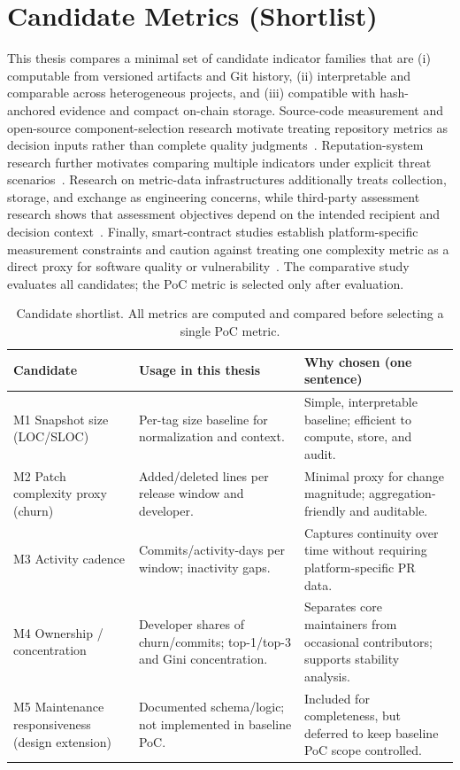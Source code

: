 \section{Candidate Metrics (Shortlist)}
\label{sec:candidate_metrics}

This thesis compares a minimal set of candidate indicator families that are (i) computable from versioned artifacts and Git history,
(ii) interpretable and comparable across heterogeneous projects, and (iii) compatible with hash-anchored evidence and compact
on-chain storage. Source-code measurement and open-source component-selection research motivate treating repository metrics as
decision inputs rather than complete quality judgments~\cite{timoteo_software_metrics_survey,li2022ossselection}. Reputation-system
research further motivates comparing multiple indicators under explicit threat scenarios~\cite{koutrouli2015reputation,schlosser2004reputation}.
Research on metric-data infrastructures additionally treats collection, storage, and exchange as engineering concerns, while
third-party assessment research shows that assessment objectives depend on the intended recipient and decision
context~\cite{khomyakov2019metricssharing,remencius2016thirdparty}.
Finally, smart-contract studies establish platform-specific measurement constraints and caution against treating one complexity
metric as a direct proxy for software quality or vulnerability~\cite{smartmetrics2023,scvulncomplexity}. The comparative study
evaluates all candidates; the PoC metric is selected only after evaluation.

\begin{table}[H]
\centering
\renewcommand{\arraystretch}{1.18}
\begin{tabularx}{\textwidth}{p{3.3cm}X X}
\toprule
\textbf{Candidate} & \textbf{Usage in this thesis} & \textbf{Why chosen (one sentence)} \\
\midrule
M1 Snapshot size (LOC/SLOC) &
Per-tag size baseline for normalization and context. &
Simple, interpretable baseline; efficient to compute, store, and audit. \\
M2 Patch complexity proxy (churn) &
Added/deleted lines per release window and developer. &
Minimal proxy for change magnitude; aggregation-friendly and auditable. \\
M3 Activity cadence &
Commits/activity-days per window; inactivity gaps. &
Captures continuity over time without requiring platform-specific PR data. \\
M4 Ownership / concentration &
Developer shares of churn/commits; top-1/top-3 and Gini concentration. &
Separates core maintainers from occasional contributors; supports stability analysis. \\
M5 Maintenance responsiveness (design extension) &
Documented schema/logic; not implemented in baseline PoC. &
Included for completeness, but deferred to keep baseline PoC scope controlled. \\
\bottomrule
\end{tabularx}
\caption{Candidate shortlist. All metrics are computed and compared before selecting a single PoC metric.}
\label{tab:metric_shortlist}
\end{table}





